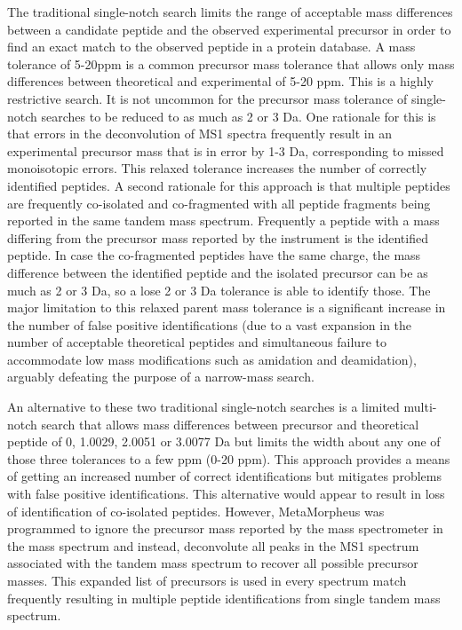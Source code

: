 \documentclass[journal=jprobs,manuscript=article]{achemso}
\begin{document}
The traditional single-notch search limits the range of acceptable mass differences between a candidate peptide and the observed experimental precursor in order to find an exact match to the observed peptide in a protein database.
A mass tolerance of 5-20ppm is a common precursor mass tolerance that allows only mass differences between theoretical and experimental of 5-20 ppm.
This is a highly restrictive search.
It is not uncommon for the precursor mass tolerance of single-notch searches to be reduced to as much as 2 or 3 Da.
One rationale for this is that errors in the deconvolution of MS1 spectra frequently result in an experimental precursor mass that is in error by 1-3 Da, corresponding to missed monoisotopic errors.
This relaxed tolerance increases the number of correctly identified peptides.
A second rationale for this approach is that multiple peptides are frequently co-isolated and co-fragmented with all peptide fragments being reported in the same tandem mass spectrum.
Frequently a peptide with a mass differing from the precursor mass reported by the instrument is the identified peptide.
In case the co-fragmented peptides have the same charge, the mass difference between the identified peptide and the isolated precursor can be as much as 2 or 3 Da, so a lose 2 or 3 Da tolerance is able to identify those.
The major limitation to this relaxed parent mass tolerance is a significant increase in the number of false positive identifications (due to a vast expansion in the number of acceptable theoretical peptides and simultaneous failure to accommodate low mass modifications such as amidation and deamidation), arguably defeating the purpose of a narrow-mass search.
 
An alternative to these two traditional single-notch searches is a limited multi-notch search that allows mass differences between precursor and theoretical peptide of 0, 1.0029, 2.0051 or 3.0077 Da but limits the width about any one of those three tolerances to a few ppm (0-20 ppm).
This approach provides a means of getting an increased number of correct identifications but mitigates problems with false positive identifications.
This alternative would appear to result in loss of identification of co-isolated peptides.
However, MetaMorpheus was programmed to ignore the precursor mass reported by the mass spectrometer in the mass spectrum and instead, deconvolute all peaks in the MS1 spectrum associated with the tandem mass spectrum to recover all possible precursor masses.
This expanded list of precursors is used in every spectrum match frequently resulting in multiple peptide identifications from single tandem mass spectrum.  
\end{document}
